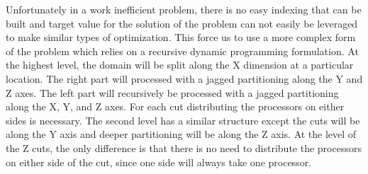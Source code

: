 \documentclass{article}
\begin{document}
Unfortunately in a work inefficient problem, there is no easy indexing
that can be built and target value for the solution of the problem can
not easily be leveraged to make similar types of optimization. This
force us to use a more complex form of the problem which relies on a
recursive dynamic programming formulation. At the highest level, the
domain will be split along the X dimension at a particular
location. The right part will processed with a jagged partitioning
along the Y and Z axes. The left part will recursively be processed
with a jagged partitioning along the X, Y, and Z axes. For each cut
distributing the processors on either sides is necessary. The second
level has a similar structure except the cuts will be along the Y axis
and deeper partitioning will be along the Z axis. At the level of the
Z cuts, the only difference is that there is no need to distribute the
processors on either side of the cut, since one side will always take
one processor. 
\end{document}
